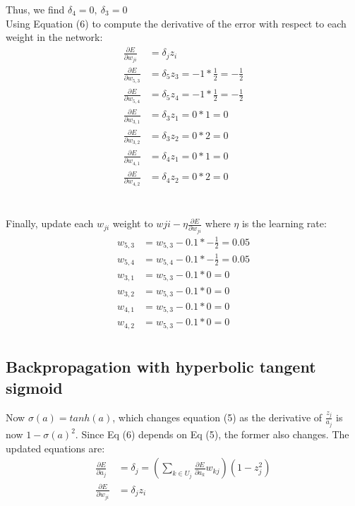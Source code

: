 \documentclass{article}
\begin{document}
Thus, we find $\delta_4 = 0,~\delta_3 = 0$
\\
Using Equation (6) to compute the derivative of the error with respect to each weight in the network: \\
\begin{align*}
\frac{\partial E}{\partial w_{ji}} &= \delta_j z_i \tag{6} \\
\frac{\partial E}{\partial w_{5,3}} &= \delta_5 z_3 = -1*\frac{1}{2} = -\frac{1}{2} \\
\frac{\partial E}{\partial w_{5,4}} &= \delta_5 z_4 = -1*\frac{1}{2} = -\frac{1}{2} \\
\frac{\partial E}{\partial w_{3,1}} &= \delta_3 z_1 = 0*1 = 0 \\
\frac{\partial E}{\partial w_{3,2}} &= \delta_3 z_2 = 0*2 = 0 \\
\frac{\partial E}{\partial w_{4,1}} &= \delta_4 z_1 = 0*1 = 0 \\
\frac{\partial E}{\partial w_{4,2}} &= \delta_4 z_2 = 0*2 = 0
\end{align*}
\\
\\
Finally, update each $w_{ji}$ weight to $w{ji} - \eta \frac{\partial E}{\partial w_{ji}}$ where $\eta$ is the learning rate:
\begin{align*}
 w_{5,3} &= w_{5,3} - 0.1*-\frac{1}{2} = 0.05\\
 w_{5,4} &= w_{5,4} - 0.1*-\frac{1}{2} = 0.05\\
 w_{3,1} &= w_{5,3} - 0.1*0 = 0\\
 w_{3,2} &= w_{5,3} - 0.1*0 = 0\\
 w_{4,1} &= w_{5,3} - 0.1*0 = 0\\
 w_{4,2} &= w_{5,3} - 0.1*0 = 0\\
\end{align*}


\subsection*{Backpropagation with hyperbolic tangent sigmoid}
Now $\sigma(a) = tanh(a)$, which changes equation (5) as the derivative of $\frac{z_j}{a_j}$ is now $1 - \sigma(a)^2$. Since Eq (6) depends on Eq (5), the former also changes. 
The updated equations are:
\begin{align*}
\frac{\partial E}{\partial a_j} &= \delta_j = \left( \sum_{k \in U_j} \frac{\partial E}{\partial a_k} w_{kj}  \right) \left( 1 - z_j^2 \right) \tag{5} \\
\frac{\partial E}{\partial w_{ji}} &= \delta_j z_i  \tag{6}
\end{align*}
\end{document}
